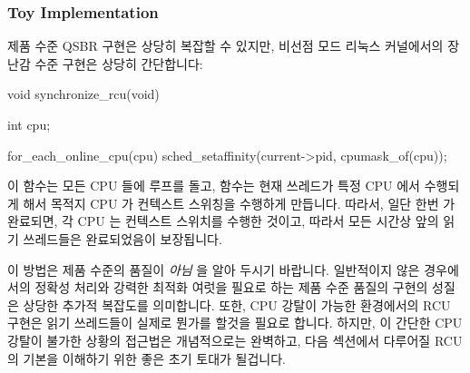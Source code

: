 \subsubsection{Toy Implementation}
\label{sec:defer:Toy Implementation}

제품 수준 QSBR 구현은 상당히 복잡할 수 있지만, 비선점 모드 리눅스 커널에서의
장난감 수준 구현은 상당히 간단합니다:

\begin{VerbatimN}[samepage=true]
void synchronize_rcu(void)
{
	int cpu;

	for_each_online_cpu(cpu)
		sched_setaffinity(current->pid, cpumask_of(cpu));
}
\end{VerbatimN}

이  함수는 모든 CPU 들에 루프를 돌고,
 함수는 현재 쓰레드가 특정 CPU 에서 수행되게 해서
목적지 CPU 가 컨텍스트 스위칭을 수행하게 만듭니다.
따라서, 일단 한번  가 완료되면, 각 CPU 는 컨텍스트
스위치를 수행한 것이고, 따라서 모든 시간상 앞의 읽기 쓰레드들은 완료되었음이
보장됩니다.

이 방법은 제품 수준의 품질이 \emph{아님} 을 알아 두시기 바랍니다.
일반적이지 않은 경우에서의 정확성 처리와 강력한 최적화 여럿을 필요로 하는 제품
수준 품질의 구현의 성질은 상당한 추가적 복잡도를 의미합니다.
또한, CPU 강탈이 가능한 환경에서의 RCU 구현은 읽기 쓰레드들이 실제로 뭔가를
할것을 필요로 합니다.
하지만, 이 간단한 CPU 강탈이 불가한 상황의 접근법은 개념적으로는 완벽하고, 다음
섹션에서 다루어질 RCU 의 기본을 이해하기 위한 좋은 초기 토대가 될겁니다.

